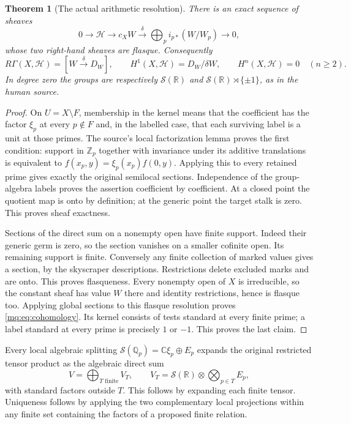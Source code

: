 \documentclass[11pt,a4paper]{article}
\newtheorem{theorem}{Theorem}[section]
\theoremstyle{definition}\newtheorem{definition}[theorem]{Definition}
\newcommand{\Z}{\mathbb Z}\newcommand{\Q}{\mathbb Q}
\newcommand{\C}{\mathbb C}\newcommand{\R}{\mathbb R}
\begin{document}
\begin{theorem}[The actual arithmetic resolution]
\label{mq:thm:resolution}
There is an exact sequence of sheaves
\[
 0\longrightarrow\mathcal H\longrightarrow c_XW
 \xrightarrow{\delta}\bigoplus_p i_{p*}(W/W_p)
 \longrightarrow0,
 \tag{MQ3}\label{mq:eq:resolution}
\]
whose two right-hand sheaves are flasque. Consequently
\[
 R\Gamma(X,\mathcal H)=[W\xrightarrow{\delta}D_W],
 \qquad H^1(X,\mathcal H)=D_W/\delta W,
 \qquad H^n(X,\mathcal H)=0\quad(n\ge2).
 \tag{MQ4}\label{mq:eq:cohomology}
\]
In degree zero the groups are respectively $\mathcal S(\mathbb R)$ and
$\mathcal S(\mathbb R)\rtimes\{\pm1\}$, as in the human source.
\end{theorem}
\begin{proof}
On $U=X\setminus F$, membership in the kernel means that the
coefficient has the factor $\xi_p$ at every $p\notin F$ and,
in the labelled case, that each surviving label is a unit at those
primes. The source's local factorization lemma proves the first
condition: support in $\Z_p$ together with invariance under its
additive translations is equivalent to
$f(x_p,y)=\xi_p(x_p)f(0,y)$. Applying this to every retained prime
gives exactly the original semilocal sections. Independence of the
group-algebra labels proves the assertion coefficient by coefficient.
At a closed point the quotient map is onto by definition; at the
generic point the target stalk is zero. This proves sheaf exactness.

Sections of the direct sum on a nonempty open have finite support.
Indeed their generic germ is zero, so the section vanishes on a
smaller cofinite open. Its remaining support is finite. Conversely
any finite collection of marked values gives a section, by the
skyscraper descriptions. Restrictions delete excluded marks and
are onto. This proves flasqueness. Every nonempty open of $X$ is
irreducible, so the constant sheaf has value $W$ there and identity
restrictions, hence is flasque too. Applying global sections to
this flasque resolution proves \eqref{mq:eq:cohomology}. Its kernel
consists of tests standard at every finite prime; a label standard
at every prime is precisely $1$ or $-1$. This proves the last claim.
\end{proof}

Every local algebraic splitting
$\mathcal S(\Q_p)=\C\xi_p\oplus E_p$ expands the original restricted
tensor product as the algebraic direct sum
\[
 V=\bigoplus_{T\text{ finite}}V_T,\qquad
 V_T=\mathcal S(\mathbb R)\otimes\bigotimes_{p\in T}E_p,
 \tag{MQ5}\label{mq:eq:algebraic-channels}
\]
with standard factors outside $T$. This follows by expanding each
finite tensor. Uniqueness follows by applying the two complementary
local projections within any finite set containing the factors of
a proposed finite relation.
\end{document}
